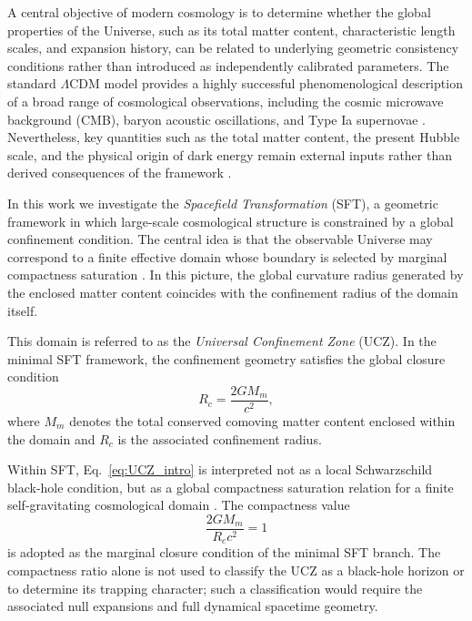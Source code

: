 \documentclass[12pt]{article}
\begin{document}
A central objective of modern cosmology is to determine whether the
global properties of the Universe, such as its total matter content,
characteristic length scales, and expansion history, can be related to
underlying geometric consistency conditions rather than introduced as
independently calibrated parameters. The standard $\Lambda$CDM model
provides a highly successful phenomenological description of a broad
range of cosmological observations, including the cosmic microwave
background (CMB), baryon acoustic oscillations, and Type Ia supernovae
\cite{Planck2020,DESI2024,Alam2021,Riess1998,Perlmutter1999}.
Nevertheless, key quantities such as the total matter content, the
present Hubble scale, and the physical origin of dark energy remain
external inputs rather than derived consequences of the framework
\cite{Weinberg1989,Carroll2001,Copeland2006}.

In this work we investigate the \emph{Spacefield Transformation} (SFT),
a geometric framework in which large-scale cosmological structure is
constrained by a global confinement condition. The central idea is that
the observable Universe may correspond to a finite effective domain
whose boundary is selected by marginal compactness saturation
\cite{MisnerSharp1964,HawkingEllis1973}. In this picture, the global
curvature radius generated by the enclosed matter content coincides with
the confinement radius of the domain itself.

This domain is referred to as the \emph{Universal Confinement Zone}
(UCZ). In the minimal SFT framework, the confinement geometry satisfies
the global closure condition
\begin{equation}
R_c
=
\frac{2GM_m}{c^2},
\label{eq:UCZ_intro}
\end{equation}
where $M_m$ denotes the total conserved comoving matter content enclosed
within the domain and $R_c$ is the associated confinement radius.

Within SFT, Eq.~\eqref{eq:UCZ_intro} is interpreted not as a local
Schwarzschild black-hole condition, but as a global compactness
saturation relation for a finite self-gravitating cosmological domain
\cite{MisnerSharp1964,HawkingEllis1973}. The compactness value
\[
\frac{2GM_m}{R_c c^2}=1
\]
is adopted as the marginal closure condition of the minimal SFT
branch. The compactness ratio alone is not used to classify the UCZ
as a black-hole horizon or to determine its trapping character; such a
classification would require the associated null expansions and full
dynamical spacetime geometry.
\end{document}
